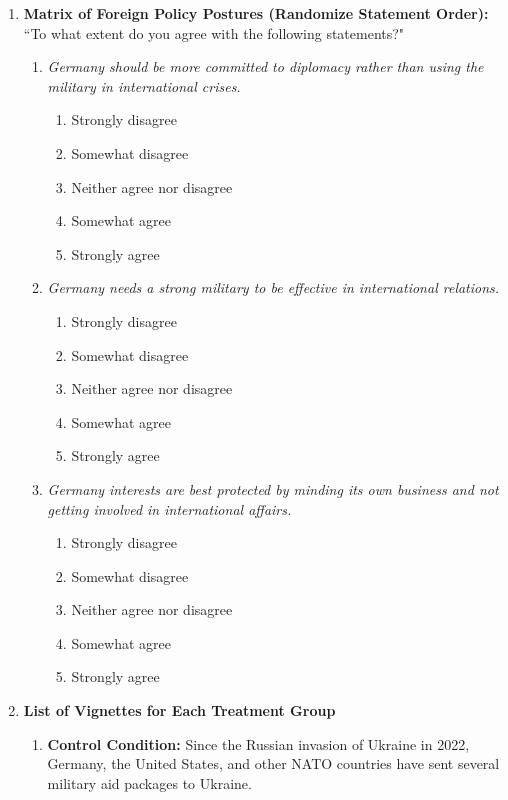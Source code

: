 \begin{appendices}
\begin{enumerate}
    \item \textbf{Matrix of Foreign Policy Postures (Randomize Statement Order):} ``To what extent do you agree with the following statements?"
    \begin{enumerate}
        \item \textit{Germany should be more committed to diplomacy rather than using the military in international crises.}
        \begin{enumerate}
            \item Strongly disagree
            \item Somewhat disagree
            \item Neither agree nor disagree
            \item Somewhat agree
            \item Strongly agree
        \end{enumerate}
        \item \textit{Germany needs a strong military to be effective in international relations.}
        \begin{enumerate}
            \item Strongly disagree
            \item Somewhat disagree
            \item Neither agree nor disagree
            \item Somewhat agree
            \item Strongly agree
        \end{enumerate}
        \item \textit{Germany interests are best protected by minding its own business and not getting involved in international affairs.}
        \begin{enumerate}
            \item Strongly disagree
            \item Somewhat disagree
            \item Neither agree nor disagree
            \item Somewhat agree
            \item Strongly agree
        \end{enumerate}
    \end{enumerate}
    \item \textbf{List of Vignettes for Each Treatment Group}
    \begin{enumerate}
        \item \textbf{Control Condition:} Since the Russian invasion of Ukraine in 2022, Germany, the United States, and other NATO countries have sent several military aid packages to Ukraine.  

\end{enumerate}
\end{enumerate}
\end{appendices}
